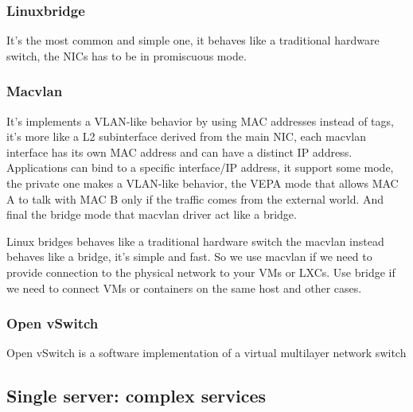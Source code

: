         \subsubsection{Linuxbridge}
        It's the most common and simple one, it behaves like a traditional hardware switch, the NICs has to be in promiscuous mode.
        \subsubsection{Macvlan}
        It's implements a VLAN-like behavior by using MAC addresses instead of tags, it's more like a L2 subinterface derived from the main NIC, each macvlan interface has its own MAC address and can have a distinct IP address. Applications can bind to a specific interface/IP address, it support some mode, the private one makes a VLAN-like behavior, the VEPA mode that allows MAC A to talk with MAC B only if the traffic comes from the external world. And final the bridge mode that macvlan driver act like a bridge.
        
        Linux bridges behaves like a traditional hardware switch the macvlan instead behaves like a bridge, it's simple and fast. So we use macvlan if we need to provide connection to the physical network to your VMs or LXCs. Use bridge if we need to connect VMs or containers on the same host and other cases.
        
        \subsubsection{Open vSwitch}
        Open vSwitch is a software implementation of a virtual multilayer network switch 
    \subsection{Single server: complex services}
    